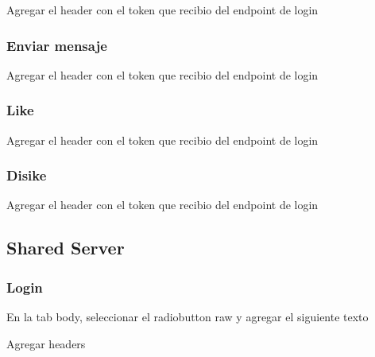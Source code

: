 \documentclass[letterpaper,10pt,english]{sphinxmanual}
\begin{document}
Agregar el header con el token que recibio del endpoint de login



\subsubsection{Enviar mensaje}
\label{manuals:enviar-mensaje}


Agregar el header con el token que recibio del endpoint de login



\subsubsection{Like}
\label{manuals:like}

Agregar el header con el token que recibio del endpoint de login



\subsubsection{Disike}
\label{manuals:disike}

Agregar el header con el token que recibio del endpoint de login



\subsection{Shared Server}
\label{manuals:id5}

\subsubsection{Login}
\label{manuals:id6}

En la tab body, seleccionar el radiobutton raw y agregar el siguiente texto


Agregar headers
\end{document}
